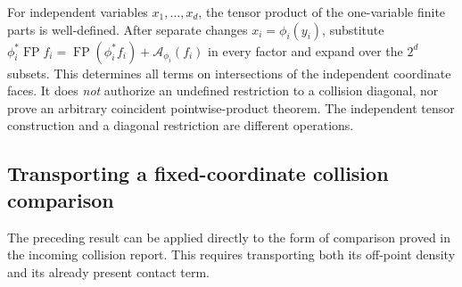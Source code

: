\documentclass[11pt]{article}
\theoremstyle{definition}\newtheorem{definition}[theorem]{Definition}
\theoremstyle{remark}\newtheorem{remark}[theorem]{Remark}
\DeclareMathOperator{\FP}{FP}
\newcommand{\Ac}{\mathcal A}
\begin{document}
For independent variables $x_1,\ldots,x_d$, the tensor product of the one-variable finite parts is well-defined. After separate changes $x_i=\phi_i(y_i)$, substitute
$\phi_i^*\FP f_i=\FP(\phi_i^*f_i)+\Ac_{\phi_i}(f_i)$ in every factor and expand over the $2^d$ subsets. This determines all terms on intersections of the independent coordinate faces. It does \emph{not} authorize an undefined restriction to a collision diagonal, nor prove an arbitrary coincident pointwise-product theorem. The independent tensor construction and a diagonal restriction are different operations.


\subsection{Transporting a fixed-coordinate collision comparison}
The preceding result can be applied directly to the form of comparison proved in the incoming collision report. This requires transporting both its off-point density and its already present contact term.
\end{document}
